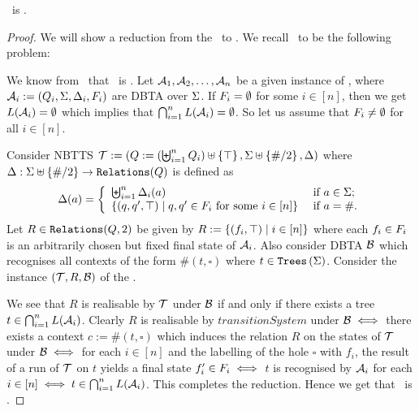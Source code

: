 \begin{theorem}\label{thm:relationRealisabilityProblemLowerBound}
    \relationRealisabilityFull\ is \expth.
\end{theorem}

\begin{proof}
    We will show a reduction from the \intersectionNonemptinessFull\ to \relationRealisabilityFull. We recall \intersectionNonemptinessFull\ to be the following problem:
    \begin{problem}
        \problemtitle{\intersectionNonemptinessFull}
    \end{problem}
    We know from~\cite{tata} that \intersectionNonemptinessFull\ is \exptc. Let $\mathcal{A}_1, \mathcal{A}_2, \dots, \mathcal{A}_n$ be a given instance of \intersectionNonemptinessFull, where $\mathcal{A}_i := (Q_i, \Sigma, \Delta_i, F_i)$ are DBTA over $\Sigma$. If $F_i = \emptyset$ for some $i \in [n]$, then we get $L(\mathcal{A}_i) = \emptyset$ which implies that $\bigcap_{i=1}^n L(\mathcal{A}_i) = \emptyset$. So let us assume that $F_i \neq \emptyset$ for all $i \in [n]$.

    Consider NBTTS $\mathcal{T} := (Q := (\biguplus_{i=1}^n Q_i)\uplus\left\{ \top \right\}, \Sigma \uplus \left\{ \#/2 \right\}, \Delta)$ where $\Delta : \Sigma \uplus \left\{ \#/2 \right\} \to \texttt{Relations}(Q)$ is defined as
    \[
        \Delta(a) = \left\{ \begin{array}{ll} \biguplus_{i=1}^n \Delta_i(a) & \mbox{ if } a \in \Sigma;\\ \left\{ (q, q', \top) \mid q, q' \in F_i \mbox{ for some } i \in [n] \right\} & \mbox{ if } a= \#. \end{array} \right.
    \]
    Let $R \in \texttt{Relations}(Q, 2)$ be given by $R := \left\{ (f_i, \top) \mid i \in [n] \right\}$ where each $f_i \in F_i$ is an arbitrarily chosen but fixed final state of $\mathcal{A}_i$. Also consider DBTA $\mathcal{B}$ which recognises all contexts of the form $\#(t, \square)$ where $t \in \texttt{Trees}\left(\Sigma\right)$. Consider the instance $(\mathcal{T}, R, \mathcal{B})$ of the \relationRealisabilityFull.

    We see that $R$ is realisable by $\mathcal{T}$ under $\mathcal{B}$ if and only if there exists a tree $t \in \bigcap_{i=1}^n L(\mathcal{A}_i)$. Clearly $R$ is realisable by $transitionSystem$ under $\mathcal{B} \iff$ there exists a context $c := \#(t, \square)$ which induces the relation $R$ on the states of $\mathcal{T}$ under $\mathcal{B} \iff$ for each $i \in [n]$ and the labelling of the hole $\square$ with $f_i$, the result of a run of $\mathcal{T}$ on $t$ yields a final state $f'_i \in F_i \iff$ $t$ is recognised by $\mathcal{A}_i$ for each $i \in [n] \iff t \in \bigcap_{i=1}^n L(\mathcal{A}_i)$. This completes the reduction. Hence we get that \relationRealisabilityFull\ is \expth.
\end{proof}

